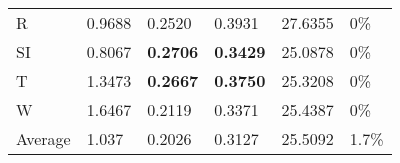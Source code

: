 \documentclass[11pt, a4paper]{article}
\begin{document}
\begin{table}[H]
\begin{tabular}{llllll}
R                                & 0.9688                            & 0.2520                            & 0.3931                               & 27.6355                                     & 0\%                               \\
SI                        & 0.8067                            & \textbf{0.2706}                   & \textbf{0.3429}                      & 25.0878                                     & 0\%                               \\
T                              & 1.3473                            & \textbf{0.2667}                   & \textbf{0.3750}                      & 25.3208                                     & 0\%                               \\
W                             & 1.6467                            & 0.2119                            & 0.3371                               & 25.4387                                     & 0\%                               \\ \hline
Average                               & 1.037                             & 0.2026                            & 0.3127                               & 25.5092                                     & 1.7\%
\end{tabular}
\end{table}
\end{document}
